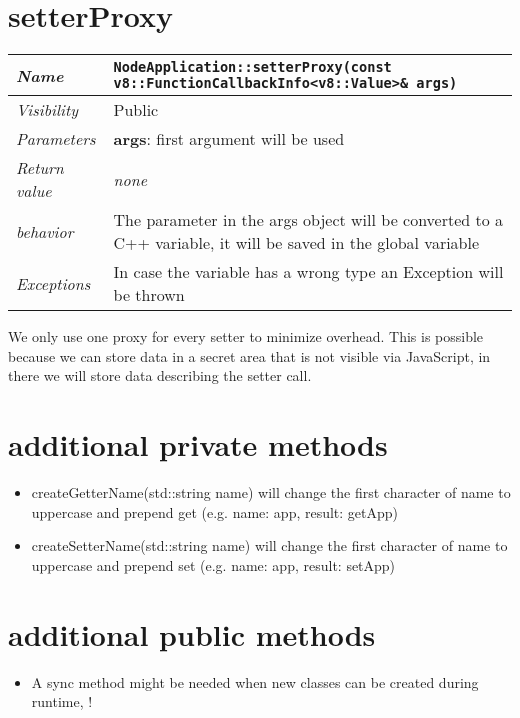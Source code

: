 \section{setterProxy}
\begin{longtable}{p{3cm} @{\hskip 1cm} p{12cm}}
  \hline
  \textit{Name} & \texttt{NodeApplication::setterProxy(const v8::FunctionCallbackInfo<v8::Value>\& args)} \\
  \hline
  \textit{Visibility} & Public \\
  \hline
  \textit{Parameters} & \textbf{args}: first argument will be used \\
  \hline
  \textit{Return value} & \textit{none} \\
  \hline
  \textit{behavior} & The parameter in the args object will be converted to a C++ variable, it will be saved in the global variable\\
  \hline
  \textit{Exceptions} & In case the variable has a wrong type an Exception will be thrown \\
  \hline
\end{longtable}
We only use one proxy for every setter to minimize overhead. This is possible because we can store data in a secret area that is not visible via JavaScript, in there we will store data describing the setter call.
\newpage
\section{additional private methods}
\begin{itemize}
  \item createGetterName(std::string name) will change the first character of name to uppercase and prepend get (e.g. name: app, result: getApp)
  \item createSetterName(std::string name) will change the first character of name to uppercase and prepend set (e.g. name: app, result: setApp)
\end{itemize}
\section{additional public methods}
\begin{itemize}
  \item A sync method might be needed when new classes can be created during runtime, \color{red}{need to evaluate this}!
\end{itemize}
